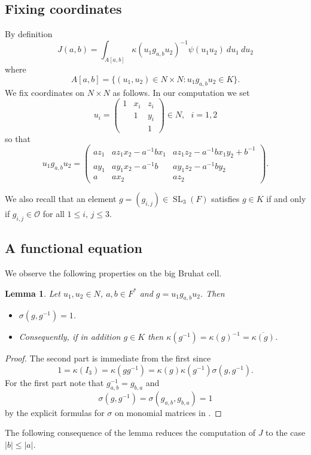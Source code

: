 \documentclass[12pt]{amsart}
\newcommand{\abs}[1]{\left|{#1}\right|}
\newcommand{\SL}{\operatorname{SL}}
\renewcommand{\O}{\mathcal{O}}
\newtheorem{lemma}[theorem]{Lemma}
\theoremstyle{remark}
\begin{document}
\subsection{Fixing coordinates}
By definition
\[
J(a,b)=\int_{A[a,b]} \kappa(u_1 g_{a,b} u_2)^{-1}\psi(u_1 u_2)\ du_1\ du_2
\]
where
\[
A[a,b]=\{(u_1,u_2)\in N\times N: u_1 g_{a,b} u_2\in K\}.
\]
We fix coordinates on $N\times N$ as follows.
In our computation we set 
\[
u_i=\begin{pmatrix} 1 & x_i & z_i \\ & 1 & y_i \\ & & 1 \end{pmatrix}\in N, \ \ \ i=1,2
\]
so that
\begin{equation}\label{eq open cell}
u_1g_{a,b}u_2=\begin{pmatrix} az_1 & az_1x_2-a^{-1}bx_1 & az_1z_2 -a^{-1}bx_1y_2+b^{-1}  \\ ay_1 & ay_1x_2 -a^{-1}b & ay_1z_2-a^{-1}by_2 \\ a & ax_2 & az_2\end{pmatrix}.
\end{equation}

We also recall that an element $g=(g_{i,j})\in \SL_3(F)$ satisfies $g\in K$ if and only if $g_{i,j}\in \O$ for all $1\le i,\,j\le 3$.

\subsection{A functional equation}
We observe the following properties on the big Bruhat cell.
\begin{lemma}\label{lem: kappa inv}
Let $u_1,u_2\in N$, $a,b\in F^*$ and  $g=u_1g_{a,b} u_2$. Then
\begin{itemize}
\item $\sigma(g,g^{-1})=1$.
\item Consequently, if in addition $g\in K$ then $\kappa(g^{-1})=\kappa(g)^{-1}=\overline{\kappa(g)}$.
\end{itemize}
\end{lemma}
\begin{proof}
The second part is immediate from the first since 
\[
1=\kappa(I_3)=\kappa(gg^{-1})=\kappa(g)\kappa(g^{-1})\sigma(g,g^{-1}). 
\]
For the first part note that $g_{a,b}^{-1}=g_{b,a}$ and
\[
\sigma(g,g^{-1})=\sigma(g_{a,b},g_{b,a})=1
\]
by the explicit formulas for $\sigma$ on monomial matrices in \cite[\S 2]{MR904946}. 
\end{proof}
The following consequence of the lemma reduces the computation of $J$ to the case $\abs{b}\le \abs{a}$.
\end{document}
